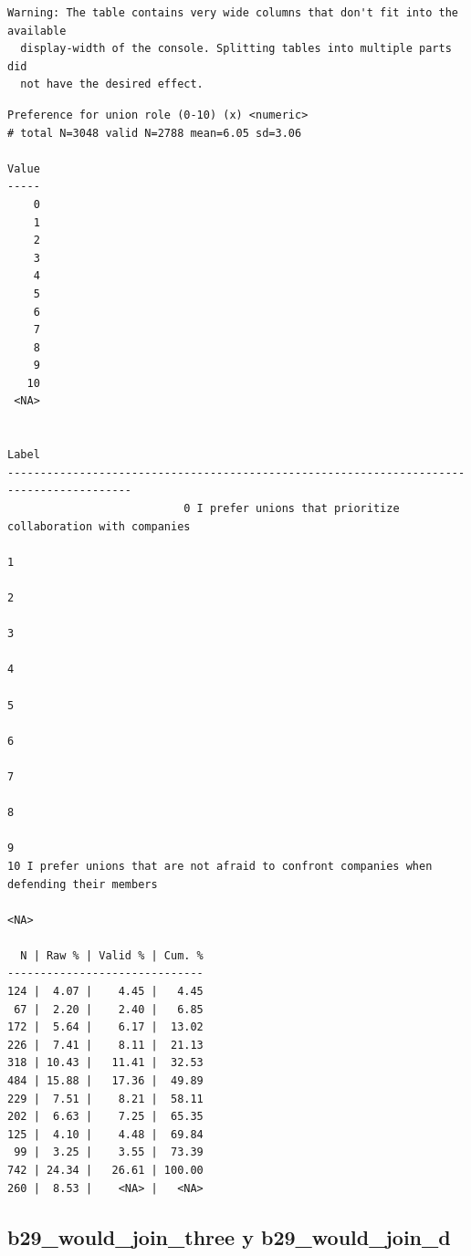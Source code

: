 \documentclass[
  letterpaper,
  DIV=11,
  numbers=noendperiod]{scrreprt}
\begin{document}
\begin{verbatim}
Warning: The table contains very wide columns that don't fit into the available
  display-width of the console. Splitting tables into multiple parts did
  not have the desired effect.
\end{verbatim}

\begin{verbatim}
Preference for union role (0-10) (x) <numeric> 
# total N=3048 valid N=2788 mean=6.05 sd=3.06

Value
-----
    0
    1
    2
    3
    4
    5
    6
    7
    8
    9
   10
 <NA>

                                                                                    Label
-----------------------------------------------------------------------------------------
                           0 I prefer unions that prioritize collaboration with companies
                                                                                        1
                                                                                        2
                                                                                        3
                                                                                        4
                                                                                        5
                                                                                        6
                                                                                        7
                                                                                        8
                                                                                        9
10 I prefer unions that are not afraid to confront companies when defending their members
                                                                                     <NA>

  N | Raw % | Valid % | Cum. %
------------------------------
124 |  4.07 |    4.45 |   4.45
 67 |  2.20 |    2.40 |   6.85
172 |  5.64 |    6.17 |  13.02
226 |  7.41 |    8.11 |  21.13
318 | 10.43 |   11.41 |  32.53
484 | 15.88 |   17.36 |  49.89
229 |  7.51 |    8.21 |  58.11
202 |  6.63 |    7.25 |  65.35
125 |  4.10 |    4.48 |  69.84
 99 |  3.25 |    3.55 |  73.39
742 | 24.34 |   26.61 | 100.00
260 |  8.53 |    <NA> |   <NA>
\end{verbatim}

\subsection{b29\_would\_join\_three y
b29\_would\_join\_d}\label{b29_would_join_three-y-b29_would_join_d}
\end{document}
